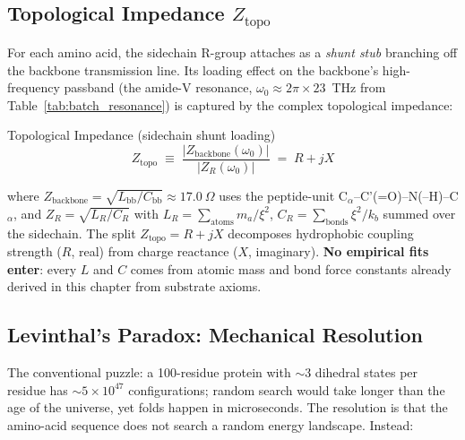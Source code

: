 \subsection{Topological Impedance \texorpdfstring{$Z_{\text{topo}}$}{Z\_topo}}

For each amino acid, the sidechain R-group attaches as a \emph{shunt stub} branching off the backbone transmission line. Its loading effect on the backbone's high-frequency passband (the amide-V resonance, $\omega_0 \approx 2\pi \times 23$~THz from Table~\ref{tab:batch_resonance}) is captured by the complex topological impedance:
\begin{resultbox}{Topological Impedance (sidechain shunt loading)}
\begin{equation}
    Z_{\text{topo}} \;\equiv\; \frac{|Z_{\text{backbone}}(\omega_0)|}{|Z_R(\omega_0)|}
    \;=\; R + jX
    \label{eq:z_topo_def_core}
\end{equation}
\end{resultbox}
where $Z_{\text{backbone}} = \sqrt{L_{\text{bb}}/C_{\text{bb}}} \approx 17.0~\Omega$ uses the peptide-unit C$_\alpha$--C'(=O)--N(--H)--C$_\alpha$, and $Z_R = \sqrt{L_R/C_R}$ with $L_R = \sum_\text{atoms} m_a/\xi^2$, $C_R = \sum_\text{bonds} \xi^2/k_b$ summed over the sidechain. The split $Z_{\text{topo}} = R + jX$ decomposes hydrophobic coupling strength ($R$, real) from charge reactance ($X$, imaginary). \textbf{No empirical fits enter}: every $L$ and $C$ comes from atomic mass and bond force constants already derived in this chapter from substrate axioms.

\subsection{Levinthal's Paradox: Mechanical Resolution}

The conventional puzzle: a 100-residue protein with $\sim 3$ dihedral states per residue has $\sim 5 \times 10^{47}$ configurations; random search would take longer than the age of the universe, yet folds happen in microseconds. The resolution is that the amino-acid sequence does not search a random energy landscape. Instead:

